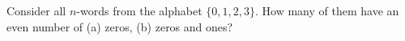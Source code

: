 Consider all $n$-words from the alphabet $\{0, 1, 2, 3\}$. How many of them have an even number of (a) zeros, (b) zeros and ones?
